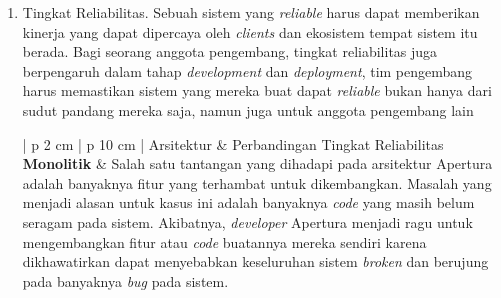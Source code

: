\begin{enumerate}[leftmargin=*]
	\item Tingkat Reliabilitas. Sebuah sistem yang \textit{reliable} harus dapat memberikan kinerja yang dapat dipercaya oleh \textit{clients} dan ekosistem tempat sistem itu berada. Bagi seorang anggota pengembang, tingkat reliabilitas juga berpengaruh dalam tahap \textit{development} dan \textit{deployment}, tim pengembang harus memastikan sistem yang mereka buat dapat \textit{reliable} bukan hanya dari sudut pandang mereka saja, namun juga untuk anggota pengembang lain
	\begin{table}[H]
		\small
		\begin{adjustbox}{width=1\textwidth}
			\begin{tabular}{| p {2 cm} | p {10 cm} |}
				\hline
				Arsitektur & Perbandingan Tingkat Reliabilitas\\
				\hline
				\textbf{Monolitik} & Salah satu tantangan yang dihadapi pada arsitektur Apertura adalah banyaknya fitur yang terhambat untuk dikembangkan. Masalah yang menjadi alasan untuk kasus ini adalah banyaknya \textit{code} yang masih belum seragam pada sistem. Akibatnya, \textit{developer} Apertura menjadi ragu untuk mengembangkan fitur atau \textit{code} buatannya mereka sendiri karena dikhawatirkan dapat menyebabkan keseluruhan sistem \textit{broken} dan berujung pada banyaknya \textit{bug} pada sistem.
				

\end{tabular}
\end{adjustbox}
\end{table}
\end{enumerate}
